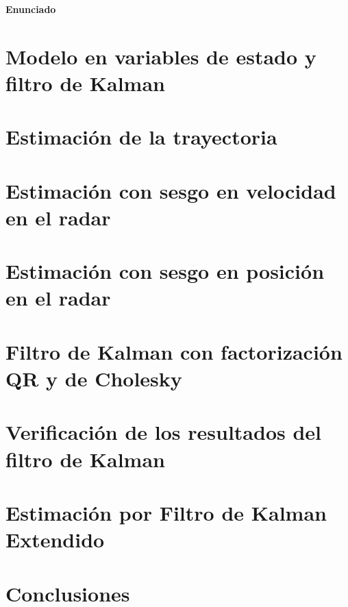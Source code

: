\documentclass[10pt,a4paper]{article}
\begin{document}
		
	\setcounter{page}{1}

\begin{center}{\Large{\textbf{Enunciado}}}\end{center}
		

	\section{Modelo en variables de estado y filtro de Kalman}\label{sec:ej1}
		
		
	\section{Estimación de la trayectoria}\label{sec:ej2}
		

	\section{Estimación con sesgo en velocidad en el radar}\label{sec:ej3}
		

	\section{Estimación con sesgo en posición en el radar}\label{sec:ej4}
		

	\section{Filtro de Kalman con factorización QR y de Cholesky}\label{sec:ej5}
		

	\section{Verificación de los resultados del filtro de Kalman}\label{sec:ej6}
		

	\section{Estimación por Filtro de Kalman Extendido}\label{sec:ej7}
		

	\section{Conclusiones}\label{sec:conclusiones}
		

\end{document}
